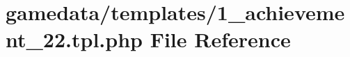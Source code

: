 \hypertarget{1__achievement__22_8tpl_8php}{\section{gamedata/templates/1\+\_\+achievement\+\_\+22.tpl.\+php File Reference}
\label{1__achievement__22_8tpl_8php}
}

